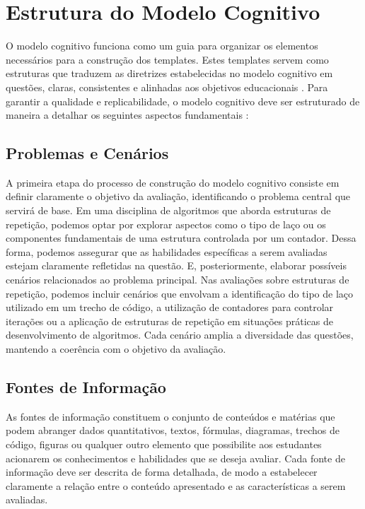 \section{Estrutura do Modelo Cognitivo}

O modelo cognitivo funciona como um guia para organizar os elementos necessários para a construção dos templates. Estes templates servem como estruturas que traduzem as diretrizes estabelecidas no modelo cognitivo em questões, claras, consistentes e alinhadas aos objetivos educacionais \parencite{keehner2017, gierl2017}. Para garantir a qualidade e replicabilidade, o modelo cognitivo deve ser estruturado de maneira a detalhar os seguintes aspectos fundamentais : 

\subsection{Problemas e Cenários}

A primeira etapa do processo de construção do modelo cognitivo consiste em definir claramente o objetivo da avaliação, identificando o problema central que servirá de base. Em uma disciplina de algoritmos que aborda estruturas de repetição, podemos optar por explorar aspectos como o tipo de laço ou os componentes fundamentais de uma estrutura controlada por um contador. Dessa forma, podemos assegurar que as habilidades específicas a serem avaliadas estejam claramente refletidas na questão. E, posteriormente, elaborar possíveis cenários relacionados ao problema principal. Nas avaliações sobre estruturas de repetição, podemos incluir cenários que envolvam a identificação do tipo de laço utilizado em um trecho de código, a utilização de contadores para controlar iterações ou a aplicação de estruturas de repetição em situações práticas de desenvolvimento de algoritmos. Cada cenário amplia a diversidade das questões, mantendo a coerência com o objetivo da avaliação.

\subsection{Fontes de Informação}

As fontes de informação constituem o conjunto de conteúdos e matérias que podem abranger dados quantitativos, textos, fórmulas, diagramas, trechos de código, figuras ou qualquer outro elemento que possibilite aos estudantes acionarem os conhecimentos e habilidades que se deseja avaliar. Cada fonte de informação deve ser descrita de forma detalhada, de modo a estabelecer claramente a relação entre o conteúdo apresentado e as características a serem avaliadas.


